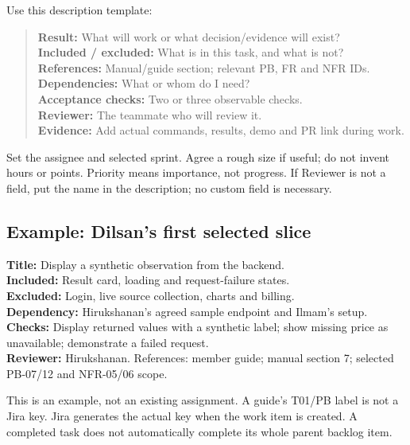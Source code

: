 Use this description template:
\begin{quote}
\textbf{Result:} What will work or what decision/evidence will exist?\\
\textbf{Included / excluded:} What is in this task, and what is not?\\
\textbf{References:} Manual/guide section; relevant PB, FR and NFR IDs.\\
\textbf{Dependencies:} What or whom do I need?\\
\textbf{Acceptance checks:} Two or three observable checks.\\
\textbf{Reviewer:} The teammate who will review it.\\
\textbf{Evidence:} Add actual commands, results, demo and PR link during work.
\end{quote}
Set the assignee and selected sprint. Agree a rough size if useful; do not invent hours or points. Priority means importance, not progress. If Reviewer is not a field, put the name in the description; no custom field is necessary.

\subsection*{Example: Dilsan's first selected slice}
\textbf{Title:} Display a synthetic observation from the backend.\\
\textbf{Included:} Result card, loading and request-failure states.\\
\textbf{Excluded:} Login, live source collection, charts and billing.\\
\textbf{Dependency:} Hirukshanan's agreed sample endpoint and Ilmam's setup.\\
\textbf{Checks:} Display returned values with a synthetic label; show missing price as unavailable; demonstrate a failed request.\\
\textbf{Reviewer:} Hirukshanan. References: member guide; manual section 7; selected PB-07/12 and NFR-05/06 scope.

This is an example, not an existing assignment. A guide's T01/PB label is not a Jira key. Jira generates the actual key when the work item is created. A completed task does not automatically complete its whole parent backlog item.

